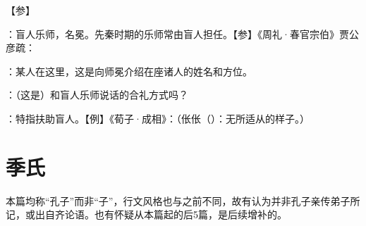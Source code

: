 {
【参】 
}
{}


{
\item {}：盲人乐师，名冕。先秦时期的乐师常由盲人担任。【参】《周礼·春官宗伯》贾公彦疏：
\item {}：某人在这里，这是向师冕介绍在座诸人的姓名和方位。
\item {}：（这是）和盲人乐师说话的合礼方式吗？
\item {}：特指扶助盲人。【例】《荀子·成相》：（伥伥（）：无所适从的样子。）
}
{}



\chapter{季氏}

本篇均称“孔子”而非“子”，行文风格也与之前不同，故有认为并非孔子亲传弟子所记，或出自齐论语。也有怀疑从本篇起的后5篇，是后续增补的。%

\bigskip

